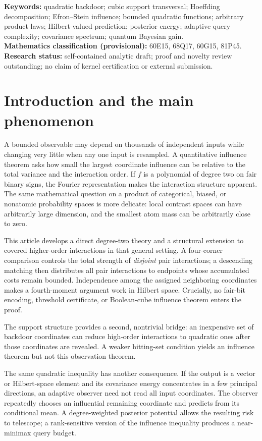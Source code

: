 \documentclass[11pt,letterpaper]{article}
\theoremstyle{definition}
\begin{document}
\noindent\textbf{Keywords:} quadratic backdoor; cubic support transversal; Hoeffding decomposition; Efron--Stein influence;
bounded quadratic functions; arbitrary product laws; Hilbert-valued prediction;
posterior energy; adaptive query complexity; covariance spectrum; quantum Bayesian gain.\\
\textbf{Mathematics classification (provisional):} 60E15, 68Q17, 60G15, 81P45.\\
\textbf{Research status:} self-contained analytic draft; proof and novelty review outstanding; no claim of kernel certification or external submission.

\section{Introduction and the main phenomenon}\label{sec:intro}
A bounded observable may depend on thousands of independent inputs while changing
very little when any one input is resampled. A quantitative influence theorem
asks how small the largest coordinate influence can be relative to the total
variance and the interaction order. If $f$ is a polynomial of degree two on
fair binary signs, the Fourier representation makes the interaction structure
apparent. The same mathematical question on a product of categorical, biased,
or nonatomic probability spaces is more delicate: local contrast spaces can
have arbitrarily large dimension, and the smallest atom mass can be arbitrarily
close to zero.

This article develops a direct degree-two theory and a structural extension to covered higher-order interactions in that general setting.
A four-corner comparison controls the total strength of \emph{disjoint} pair
interactions; a descending matching then distributes all pair interactions
to endpoints whose accumulated costs remain bounded. Independence among the
assigned neighboring coordinates makes a fourth-moment argument work in
Hilbert space. Crucially, no fair-bit encoding, threshold certificate, or
Boolean-cube influence theorem enters the proof.

The support structure provides a second, nontrivial bridge: an inexpensive set of backdoor coordinates can reduce high-order interactions to quadratic ones after those coordinates are revealed. A weaker hitting-set condition yields an influence theorem but not this observation theorem.\par\medskip
The same quadratic inequality has another consequence. If the output is a vector or
Hilbert-space element and its covariance energy concentrates in a few
principal directions, an adaptive observer need not read all input coordinates.
The observer repeatedly chooses an influential remaining coordinate and
predicts from its conditional mean. A degree-weighted posterior potential
allows the resulting risk to telescope; a rank-sensitive version of the
influence inequality produces a near-minimax query budget.
\end{document}
